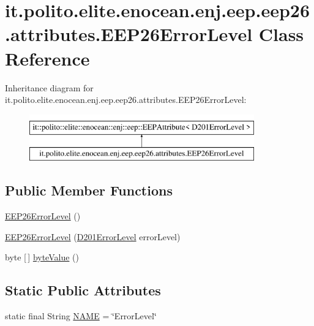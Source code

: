 \hypertarget{classit_1_1polito_1_1elite_1_1enocean_1_1enj_1_1eep_1_1eep26_1_1attributes_1_1_e_e_p26_error_level}{}\section{it.\+polito.\+elite.\+enocean.\+enj.\+eep.\+eep26.\+attributes.\+E\+E\+P26\+Error\+Level Class Reference}
\label{classit_1_1polito_1_1elite_1_1enocean_1_1enj_1_1eep_1_1eep26_1_1attributes_1_1_e_e_p26_error_level}
Inheritance diagram for it.\+polito.\+elite.\+enocean.\+enj.\+eep.\+eep26.\+attributes.\+E\+E\+P26\+Error\+Level\+:\begin{figure}[H]
\begin{center}
\leavevmode
\includegraphics[height=2.000000cm]{classit_1_1polito_1_1elite_1_1enocean_1_1enj_1_1eep_1_1eep26_1_1attributes_1_1_e_e_p26_error_level}
\end{center}
\end{figure}
\subsection*{Public Member Functions}
\begin{DoxyCompactItemize}
\item 
\hyperlink{classit_1_1polito_1_1elite_1_1enocean_1_1enj_1_1eep_1_1eep26_1_1attributes_1_1_e_e_p26_error_level_ab733dafe4a3be65a8b281be3cfc06af7}{E\+E\+P26\+Error\+Level} ()
\item 
\hyperlink{classit_1_1polito_1_1elite_1_1enocean_1_1enj_1_1eep_1_1eep26_1_1attributes_1_1_e_e_p26_error_level_a283026bf322bc5568f0334b45d67bc70}{E\+E\+P26\+Error\+Level} (\hyperlink{enumit_1_1polito_1_1elite_1_1enocean_1_1enj_1_1eep_1_1eep26_1_1_d2_1_1_d201_1_1_d201_error_level}{D201\+Error\+Level} error\+Level)
\item 
byte \mbox{[}$\,$\mbox{]} \hyperlink{classit_1_1polito_1_1elite_1_1enocean_1_1enj_1_1eep_1_1eep26_1_1attributes_1_1_e_e_p26_error_level_a9d46c5cf3b1a984dc364e180291fb8fa}{byte\+Value} ()
\end{DoxyCompactItemize}
\subsection*{Static Public Attributes}
\begin{DoxyCompactItemize}
\item 
static final String \hyperlink{classit_1_1polito_1_1elite_1_1enocean_1_1enj_1_1eep_1_1eep26_1_1attributes_1_1_e_e_p26_error_level_a6de549ae67f2879b648876d1d26d4861}{N\+A\+ME} = \char`\"{}Error\+Level\char`\"{}
\end{DoxyCompactItemize}

